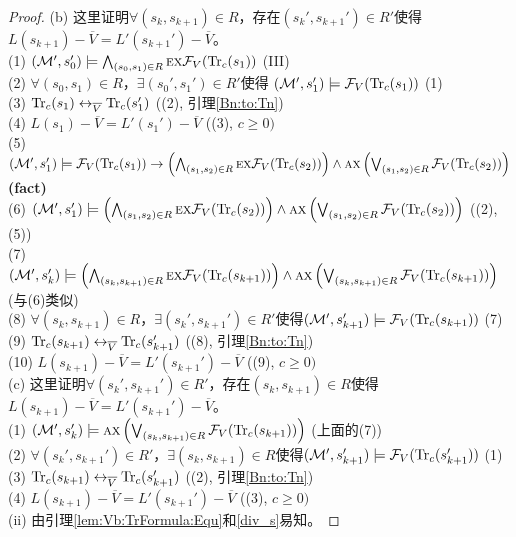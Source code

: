 \begin{proof}
	(b) 这里证明$\forall (s_k, s_{k+1}) \in R$，存在$(s_k', s_{k+1}') \in R'$使得$L(s_{k+1}) - \overline V = L'(s_{k+1}') - \overline V$。\\
	(1) $({\cal M}', s_0') \models \bigwedge_{(s_0, s_1) \in R} \textsc{e} \textsc{x} {\cal F}_V(\textrm{Tr}_c(s_1))$  \hfill  (III)\\
	(2) $\forall (s_0, s_1) \in R$，$\exists (s_0', s_1') \in R'$使得 $({\cal M}', s_1') \models {\cal F}_V(\textrm{Tr}_c(s_1))$  \hfill  (1)\\
	(3) $\textrm{Tr}_c(s_1) \leftrightarrow_{\overline V} \textrm{Tr}_c(s_1')$  \hfill  ((2), 引理\ref{Bn:to:Tn}) \\
	(4) $L(s_1) - \overline V = L'(s_1') - \overline V$  \hfill   ((3), $c \geq 0)$\\
	(5) $({\cal M}', s_1') \models {\cal F}_V(\textrm{Tr}_c(s_1)) \rightarrow \left(\bigwedge_{(s_1,s_2)\in R} \textsc{e} \textsc{x} {\cal F}_V(\textrm{Tr}_c(s_2))\right) \wedge \textsc{a} \textsc{x} \left(\bigvee_{(s_1,s_2)\in R} {\cal F}_V(\textrm{Tr}_c(s_2))\right)$     \hfill  \textbf{(fact)}\\
	(6) $({\cal M}', s_1') \models \left(\bigwedge_{(s_1,s_2)\in R} \textsc{e} \textsc{x} {\cal F}_V(\textrm{Tr}_c(s_2))\right) \wedge \textsc{a} \textsc{x} \left(\bigvee_{(s_1,s_2)\in R} {\cal F}_V(\textrm{Tr}_c(s_2))\right)$ \hfill ((2), (5))\\
	(7) $({\cal M}', s_k') \models \left(\bigwedge_{(s_k,s_{k+1})\in R} \textsc{e} \textsc{x} {\cal F}_V(\textrm{Tr}_c(s_{k+1}))\right) \wedge \textsc{a} \textsc{x} \left(\bigvee_{(s_k,s_{k+1})\in R} {\cal F}_V(\textrm{Tr}_c(s_{k+1}))\right)$       \hfill (与(6)类似)\\
	(8) $\forall (s_k, s_{k+1}) \in R$，$\exists (s_k', s_{k+1}') \in R'$使得$({\cal M}', s_{k+1}') \models {\cal F}_V(\textrm{Tr}_c(s_{k+1}))$  \hfill  (7)\\
	(9) $\textrm{Tr}_c(s_{k+1}) \leftrightarrow_{\overline V} \textrm{Tr}_c(s_{k+1}')$    \hfill ((8), 引理\ref{Bn:to:Tn}) \\
	(10) $L(s_{k+1}) - \overline V = L'(s_{k+1}') - \overline V$  \hfill   ((9), $c \geq 0)$\\
	
	(c) 这里证明$\forall (s_k', s_{k+1}') \in R'$，存在$(s_k, s_{k+1})\in R$使得$L(s_{k+1}) - \overline V = L'(s_{k+1}') - \overline V$。\\
	(1) $({\cal M}', s_k') \models \textsc{a} \textsc{x} \left(\bigvee_{(s_k,s_{k+1})\in R} {\cal F}_V(\textrm{Tr}_c(s_{k+1}))\right)$  \hfill (上面的(7))\\
	(2) $\forall (s_k', s_{k+1}') \in R'$，$\exists (s_k, s_{k+1}) \in R$使得$({\cal M}', s_{k+1}') \models {\cal F}_V(\textrm{Tr}_c(s_{k+1}'))$  \hfill (1) \\
	(3) $\textrm{Tr}_c(s_{k+1}) \leftrightarrow_{\overline V} \textrm{Tr}_c(s_{k+1}')$    \hfill ((2), 引理\ref{Bn:to:Tn}) \\
	(4) $L(s_{k+1}) - \overline V = L'(s_{k+1}') - \overline V$  \hfill   ((3), $c \geq 0)$\\
	
	(ii) 由引理\ref{lem:Vb:TrFormula:Equ}和\ref{div_s}易知。
	
\end{proof}

